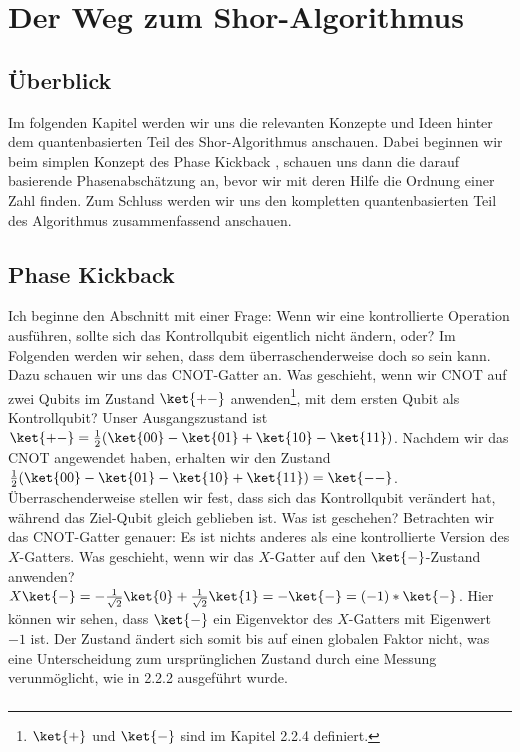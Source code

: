 \chapter{Der Weg zum Shor-Algorithmus}
\section{Überblick}
Im folgenden Kapitel werden wir uns die relevanten Konzepte und Ideen hinter dem quantenbasierten Teil des Shor-Algorithmus anschauen. Dabei beginnen wir beim simplen Konzept des \grqq Phase Kickback\grqq{} , schauen uns dann die darauf basierende Phasenabschätzung an, bevor wir mit deren Hilfe die Ordnung einer Zahl finden. Zum Schluss werden wir uns den kompletten quantenbasierten Teil des Algorithmus zusammenfassend anschauen.
\section{Phase Kickback}
Ich beginne den Abschnitt mit einer Frage: Wenn wir eine kontrollierte Operation ausführen, sollte sich das Kontrollqubit eigentlich nicht ändern, oder? Im Folgenden werden wir sehen, dass dem überraschenderweise doch so sein kann. Dazu schauen wir uns das CNOT-Gatter an. Was geschieht, wenn wir CNOT auf zwei Qubits im Zustand $\ket{+-}$ anwenden\footnote{$\ket{+}$ und $\ket{-}$ sind im Kapitel 2.2.4 definiert.}, mit dem ersten Qubit als Kontrollqubit? Unser Ausgangszustand ist $\ket{+-} = \frac{1}{2}(\ket{00} - \ket{01} + \ket{10} - \ket{11})$. Nachdem wir das CNOT angewendet haben, erhalten wir den Zustand $\frac{1}{2}(\ket{00} - \ket{01} - \ket{10} + \ket{11}) = \ket{--}$. Überraschenderweise stellen wir fest, dass sich das Kontrollqubit verändert hat, während das Ziel-Qubit gleich geblieben ist. Was ist geschehen? Betrachten wir das CNOT-Gatter genauer: Es ist nichts anderes als eine kontrollierte Version des $X$-Gatters. Was geschieht, wenn wir das $X$-Gatter auf den $\ket{-}$-Zustand anwenden? $X\ket{-} = -\frac{1}{\sqrt{2}}\ket{0} + \frac{1}{\sqrt{2}}\ket{1} = -\ket{-} = (-1)*\ket{-}$. Hier können wir sehen, dass $\ket{-}$ ein Eigenvektor des $X$-Gatters mit Eigenwert $-1$ ist. Der Zustand ändert sich somit bis auf einen globalen Faktor nicht, was eine Unterscheidung zum ursprünglichen Zustand durch eine Messung verunmöglicht, wie in 2.2.2 ausgeführt wurde.

\paragraph{}

